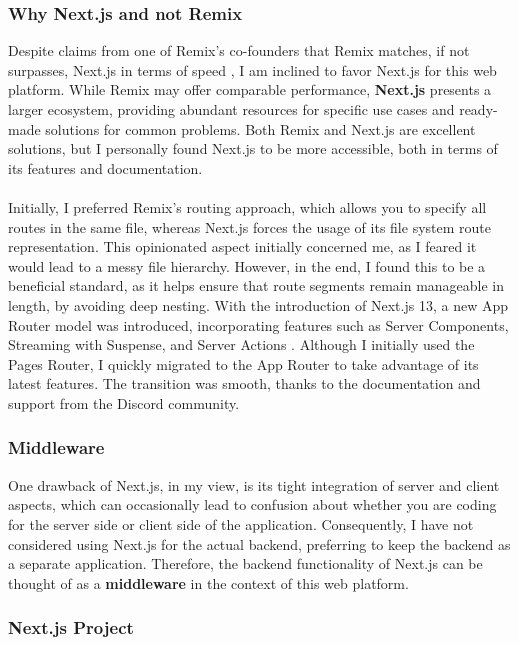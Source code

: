 \subsubsection{Why Next.js and not Remix}
\noindent Despite claims from one of Remix's co-founders that Remix matches, if not surpasses, Next.js in terms of speed \cite{remix-vs-next-according-to-remix}, I am inclined to favor Next.js for this web platform. While Remix may offer comparable performance, \textbf{Next.js} presents a larger ecosystem, providing abundant resources for specific use cases and ready-made solutions for common problems. Both Remix and Next.js are excellent solutions, but I personally found Next.js to be more accessible, both in terms of its features and documentation.
\\\\
\noindent Initially, I preferred Remix's routing approach, which allows you to specify all routes in the same file, whereas Next.js forces the usage of its file system route representation. This opinionated aspect initially concerned me, as I feared it would lead to a messy file hierarchy. However, in the end, I found this to be a beneficial standard, as it helps ensure that route segments remain manageable in length, by avoiding deep nesting. With the introduction of Next.js 13, a new App Router model was introduced, incorporating features such as Server Components, Streaming with Suspense, and Server Actions \cite{nextjs-app-router}. Although I initially used the Pages Router, I quickly migrated to the App Router to take advantage of its latest features. The transition was smooth, thanks to the documentation and support from the Discord community.

\subsubsection{Middleware}

\noindent One drawback of Next.js, in my view, is its tight integration of server and client aspects, which can occasionally lead to confusion about whether you are coding for the server side or client side of the application. Consequently, I have not considered using Next.js for the actual backend, preferring to keep the backend as a separate application. Therefore, the backend functionality of Next.js can be thought of as a \textbf{middleware} in the context of this web platform.

\subsubsection{Next.js Project}

